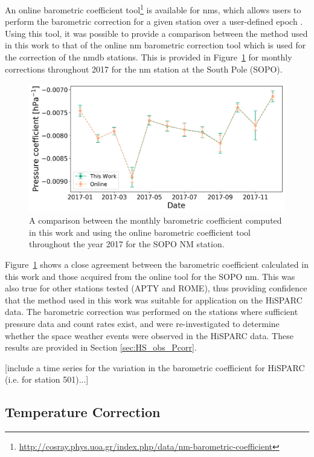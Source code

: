 An online barometric coefficient tool\footnote{\url{http://cosray.phys.uoa.gr/index.php/data/nm-barometric-coefficient}} is available for \glspl{nm}, which allows users to perform the barometric correction for a given station over a user-defined epoch \citep{paschalis_online_2013}. Using this tool, it was possible to provide a comparison between the method used in this work to that of the online \gls{nm} barometric correction tool which is used for the correction of the \gls{nmdb} stations. This is provided in Figure~\ref{fig:NM_beta_variation} for monthly corrections throughout 2017 for the \gls{nm} station at the South Pole (SOPO).

\begin{figure}[ht]
	\centering
	\includegraphics[width=0.65\columnwidth]{SOPO_beta_2017_rescale.png}
	\caption{A comparison between the monthly barometric coefficient computed in this work and using the online barometric coefficient tool throughout the year 2017 for the SOPO NM station.}
	\label{fig:NM_beta_variation}
\end{figure}


Figure~\ref{fig:NM_beta_variation} shows a close agreement between the barometric coefficient calculated in this work and those acquired from the online tool for the SOPO \gls{nm}. This was also true for other stations tested (APTY and ROME), thus providing confidence that the method used in this work was suitable for application on the HiSPARC data. The barometric correction was performed on the stations where sufficient pressure data and count rates exist, and were re-investigated to determine whether the space weather events were observed in the HiSPARC data. These results are provided in Section \ref{sec:HS_obs_Pcorr}.

[include a time series for the variation in the barometric coefficient for HiSPARC (i.e. for station 501)...]



\subsection{Temperature Correction}\label{sec:HS_T_corr}

